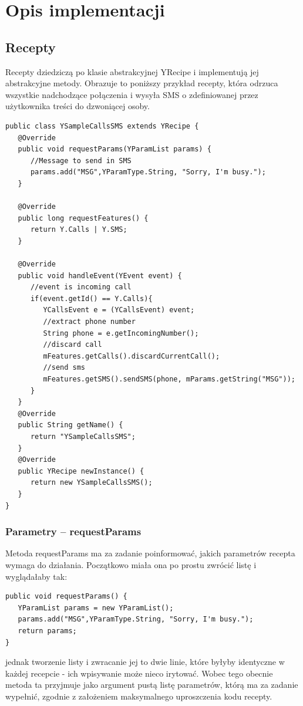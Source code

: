 \documentclass[11pt,a4paper,polish,thesis]{dcsbook}
\begin{document}
\chapter{Opis implementacji}

\section{Recepty}
Recepty dziedziczą po klasie abstrakcyjnej YRecipe i implementują jej abstrakcyjne metody. Obrazuje to poniższy przykład recepty, która odrzuca wszystkie nadchodzące połączenia i wysyła SMS o zdefiniowanej przez użytkownika treści do dzwoniącej osoby.

\begin{verbatim}
public class YSampleCallsSMS extends YRecipe {
   @Override
   public void requestParams(YParamList params) {
      //Message to send in SMS
      params.add("MSG",YParamType.String, "Sorry, I'm busy.");
   }

   @Override
   public long requestFeatures() {
      return Y.Calls | Y.SMS;
   }

   @Override
   public void handleEvent(YEvent event) {
      //event is incoming call
      if(event.getId() == Y.Calls){
         YCallsEvent e = (YCallsEvent) event;
         //extract phone number
         String phone = e.getIncomingNumber();
         //discard call
         mFeatures.getCalls().discardCurrentCall();
         //send sms
         mFeatures.getSMS().sendSMS(phone, mParams.getString("MSG"));
      }
   }
   @Override
   public String getName() {
      return "YSampleCallsSMS";
   }
   @Override
   public YRecipe newInstance() {
      return new YSampleCallsSMS();
   }
}
\end{verbatim}
\subsection{Parametry -- requestParams}
Metoda requestParams ma za zadanie poinformować, jakich parametrów recepta wymaga do działania. Początkowo miała ona po prostu zwrócić listę i wyglądałaby tak:
\begin{verbatim}
public void requestParams() {
   YParamList params = new YParamList();
   params.add("MSG",YParamType.String, "Sorry, I'm busy.");
   return params;
}
\end{verbatim}
jednak tworzenie listy i zwracanie jej to dwie linie, które byłyby identyczne w każdej recepcie - ich wpisywanie może nieco irytować. Wobec tego obecnie metoda ta przyjmuje jako argument pustą listę parametrów, którą ma za zadanie wypełnić, zgodnie z założeniem maksymalnego uproszczenia kodu recepty.
\end{document}
